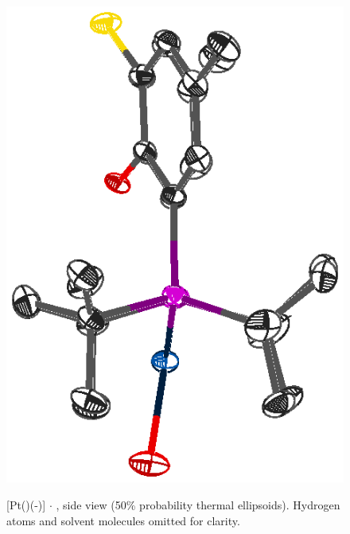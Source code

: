\begin{figure}[ht]
\begin{center}
\vspace{0.5cm}
\includegraphics{../Figures/Crystalplatinumdioxygenside.eps}
\caption[X-ray crystal structure of \texorpdfstring{[Pt(\tButhixantphos)(-){]}} P $\cdot{}$  side view]{[Pt(\tButhixantphos)(-)] $\cdot{}$ , side view (50\% probability thermal ellipsoids).  Hydrogen atoms and solvent molecules omitted for clarity.}
\vspace{0.2cm}
\label{crystal:dioxygenside}
\end{center}
\end{figure}
\vspace{0.2cm}

